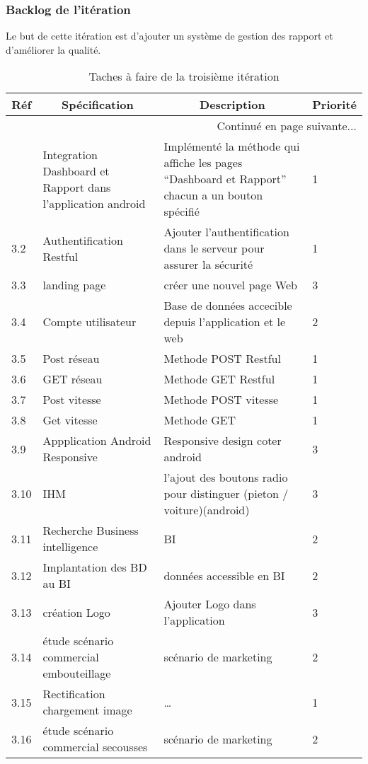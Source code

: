 \subsubsection{Backlog de l'itération}

Le but de cette itération est d'ajouter un système de gestion des rapport et d'améliorer
la qualité.

\begin{center}
    \footnotesize
    \begin{longtable}{| p{1cm} | p{5cm} | p{7cm} | p{1cm} |}
        \caption{Taches à faire de la troisième itération}
        \label{tab:sprint3-backlog} \\

 \hline
 \multicolumn{1}{|c}{\textbf{Réf}} &
 \multicolumn{1}{|c}{\textbf{Spécification}} &
 \multicolumn{1}{|c}{\textbf{Description}} &
 \multicolumn{1}{|c|}{\textbf{Priorité}} \\ \hline
 \endhead

 \hline \multicolumn{4}{|r|}{{Continué en page suivante$\dotsc$}} \\ \hline
 \endfoot

 \hline \hline
 \endlastfoot

\hline
3.1 & Integration Dashboard et Rapport dans l'application android & Implémenté la méthode qui affiche les pages ``Dashboard et Rapport'' chacun a un bouton spécifié   & 1 \\ \hline
3.2 & Authentification Restful  & Ajouter l'authentification dans le serveur pour assurer la sécurité   & 1 \\ \hline
3.3 & landing page & créer une nouvel page Web  & 3\\ \hline
3.4 & Compte utilisateur & Base de données accecible depuis l'application et le web& 2 \\ \hline
3.5 & Post réseau & Methode POST Restful & 1 \\ \hline
3.6 & GET réseau & Methode GET Restful & 1 \\ \hline
3.7 & Post vitesse & Methode POST vitesse & 1 \\ \hline
3.8 & Get vitesse & Methode GET & 1 \\ \hline
3.9 & Appplication Android Responsive & Responsive design coter android & 3 \\ \hline
3.10 & IHM & l'ajout des boutons radio pour distinguer (pieton / voiture)(android) & 3 \\ \hline
3.11 & Recherche Business intelligence & BI & 2 \\ \hline
3.12 & Implantation des BD au BI & données accessible en BI & 2\\ \hline
3.13 & création Logo &Ajouter Logo dans l'application & 3 \\ \hline
3.14 & étude scénario commercial embouteillage & scénario de marketing& 2\\ \hline
3.15 & Rectification chargement image & \ldots & 1 \\ \hline
3.16 & étude scénario commercial secousses & scénario de marketing& 2\\ \hline
\end{longtable}
\end{center}

